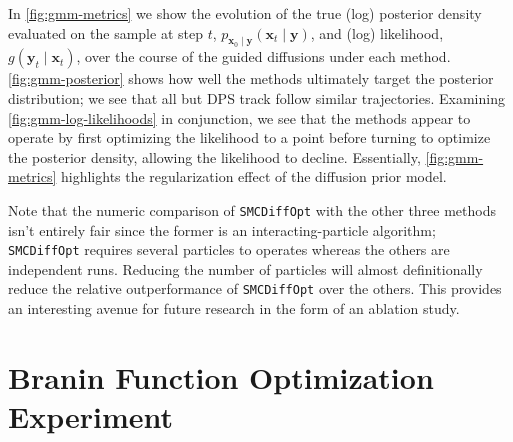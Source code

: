In \autoref{fig:gmm-metrics} we show the evolution of the true (log) posterior density evaluated on the
sample at step $t$, $p_{\mathbf{x}_0 \mid \mathbf{y}}(\mathbf{x}_t \mid \mathbf{y})$, and (log)
likelihood, $g(\mathbf{y}_t \mid \mathbf{x}_t)$, over the course of the guided diffusions under
each method. \autoref{fig:gmm-posterior} shows how well the methods ultimately target the posterior
distribution; we see that all but DPS track follow similar trajectories.
Examining \autoref{fig:gmm-log-likelihoods} in conjunction, we see that the methods appear to operate
by first optimizing the likelihood to a point before turning to optimize the posterior density,
allowing the likelihood to decline. Essentially, \autoref{fig:gmm-metrics} highlights the regularization
effect of the diffusion prior model.

Note that the numeric comparison of \texttt{SMCDiffOpt} with the other three methods isn't entirely
fair since the former is an interacting-particle algorithm; \texttt{SMCDiffOpt} requires several
particles to operates whereas the others are independent runs. Reducing the number of particles
will almost definitionally reduce the relative outperformance of \texttt{SMCDiffOpt} over the
others. This provides an interesting avenue for future research in the form of an ablation study.

\section{Branin Function Optimization Experiment} \label{sec:branin}

